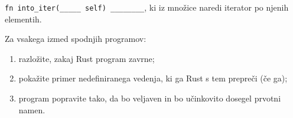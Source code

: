 \documentclass[arhiv]{../izpit}
\begin{document}
\podnaloga
  \texttt{fn into_iter(_____ self) ________}, ki iz množice naredi iterator po njenih elementih.



\naloga[\tocke{30}]

Za vsakega izmed spodnjih programov:
\begin{enumerate}
  \item razložite, zakaj Rust program zavrne;
  \item pokažite primer nedefiniranega vedenja, ki ga Rust s tem prepreči (če ga);
  \item program popravite tako, da bo veljaven in bo učinkovito dosegel prvotni namen.
\end{enumerate}

\podnaloga

\podnaloga

\podnaloga

\podnaloga

\podnaloga
\end{document}
